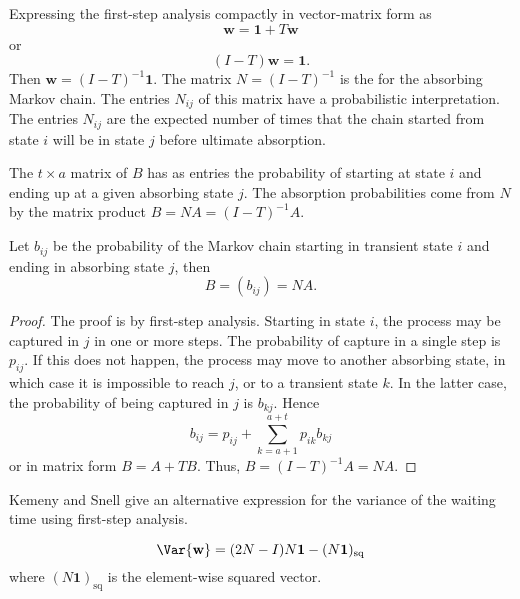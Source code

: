 \documentclass[12pt]{article}
\begin{document}
Expressing the first-step analysis compactly in vector-matrix form as
\[
    \mathbf{w} = \mathbf{1} + T \mathbf{w}
\] or
\[
    (I - T) \mathbf{w} = \mathbf{1}.
\] Then \( \mathbf{w} = (I-T)^{-1} \mathbf{1} \).  The matrix \( N = (I-T)^
{-1} \) is the %
for the absorbing Markov chain.  The entries \( N_{ij} \) of this matrix
have a probabilistic interpretation.  The entries \( N_{ij} \) are the
expected number of times that the chain started from state \( i \) will
be in state \( j \) before ultimate absorption.

The \( t \times a \) matrix of %
\( B \) has as entries the probability of starting at state \( i \) and ending up
at a given absorbing state \( j \).  The absorption probabilities come
from \( N \) by the matrix product \( B = NA = (I-T)^{-1}A \).  

\begin{theorem}
  Let \( b_{ij} \) be the probability of the Markov chain starting
  in transient state \( i \) and ending in absorbing state $j$, then
  \[
        B = ( b_{ij} ) = NA.
  \]
\end{theorem}

\begin{proof}
   The proof is by first-step analysis.  Starting in state \( i \),
   the process may be captured in \( j \) in one or more steps.  The
   probability of capture in a single step is \( p_{ij} \).  If this
   does not happen, the process may move to another absorbing state,
   in which case it is impossible to reach \( j \), or to a transient
   state \( k \).  In the latter case, the probability of being
   captured in \( j \) is \( b_{kj} \).  Hence
   \[
        b_{ij} = p_{ij} + \sum\limits_{k =a+1}^{a+t} p_{ik} b_{kj}
   \]
   or in matrix form \( B = A + TB\). Thus, \( B = (I-T)^{-1} A = NA \). 
\end{proof}

Kemeny and Snell \cite[page 51]{kemeny60} give an alternative expression for the variance of
the waiting time using first-step analysis.

\begin{theorem}
\[
     \Var{\mathbf{w}} = (2N - I)N\mathbf{1} -
     (N\mathbf{1})_{\text{sq}}
\]
where \( (N\mathbf{1})_{\text{sq}} \) is the element-wise squared vector.
\end{theorem}
\end{document}
